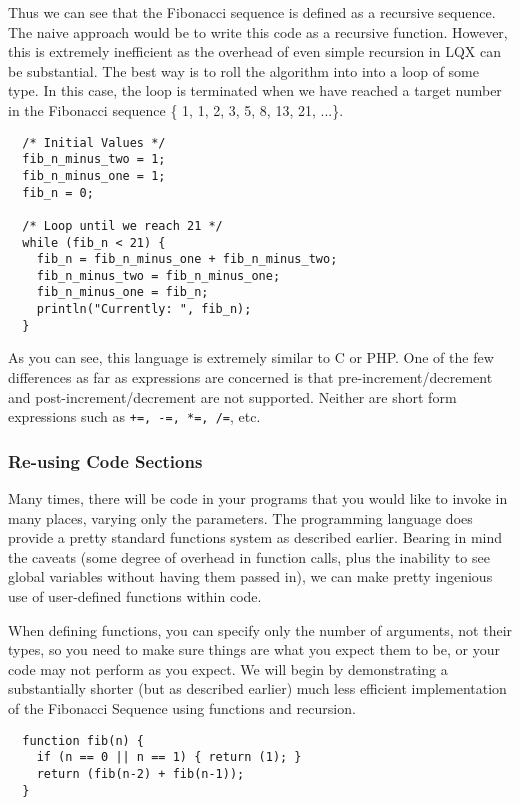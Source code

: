 Thus we can see that the Fibonacci sequence is defined as a recursive sequence.
The naive approach would be to write this code as a recursive function. However,
this is extremely inefficient as the overhead of even simple recursion in LQX
can be substantial. The best way is to roll the algorithm into into a loop of some
type. In this case, the loop is terminated when we have reached a target
number in the Fibonacci sequence \{ 1, 1, 2, 3, 5, 8, 13, 21, ...\}.

\lstset{language=C++}
\begin{lstlisting}  
  /* Initial Values */
  fib_n_minus_two = 1;
  fib_n_minus_one = 1;
  fib_n = 0;
  
  /* Loop until we reach 21 */
  while (fib_n < 21) {
    fib_n = fib_n_minus_one + fib_n_minus_two;
    fib_n_minus_two = fib_n_minus_one;
    fib_n_minus_one = fib_n;
    println("Currently: ", fib_n);
  } 
\end{lstlisting}

As you can see, this language is extremely similar to C or PHP. One of the
few differences as far as expressions are concerned is that pre-increment/decrement 
and post-increment/decrement are not supported. Neither are short form expressions such
as {\tt +=, -=, *=, /=}, etc.

\subsubsection{Re-using Code Sections}

Many times, there will be code in your \ModLang programs that you would like to invoke
in many places, varying only the parameters. The \ModLang programming language does
provide a pretty standard functions system as described earlier. Bearing in mind the
caveats (some degree of overhead in function calls, plus the inability to see
global variables without having them passed in), we can make pretty ingenious use
of user-defined functions within \ModLang code.

When defining functions, you can specify only the number of arguments, not their
types, so you need to make sure things are what you expect them to be, or your
code may not perform as you expect. We will begin by demonstrating a substantially
shorter (but as described earlier) much less efficient implementation of the
Fibonacci Sequence using functions and recursion.

\lstset{language=C++}
\begin{lstlisting}
  function fib(n) {
    if (n == 0 || n == 1) { return (1); }
    return (fib(n-2) + fib(n-1));
  }
\end{lstlisting}

